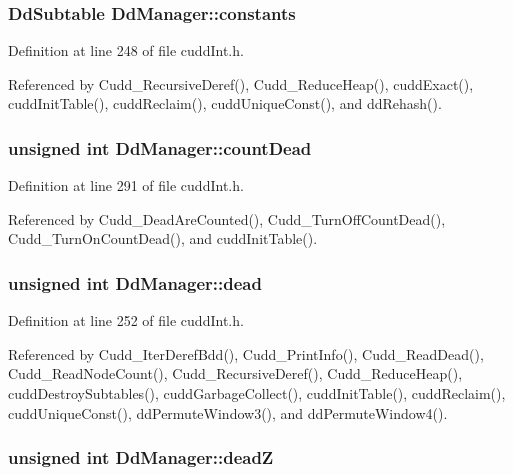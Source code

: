 \subsubsection{\setlength{\rightskip}{0pt plus 5cm}\bf{Dd\-Subtable} \bf{Dd\-Manager::constants}}\label{structDdManager_a8d293b6a4f69f6b4795e2fc24ede216}




Definition at line 248 of file cudd\-Int.h.

Referenced by Cudd\_\-Recursive\-Deref(), Cudd\_\-Reduce\-Heap(), cudd\-Exact(), cudd\-Init\-Table(), cudd\-Reclaim(), cudd\-Unique\-Const(), and dd\-Rehash().
\subsubsection{\setlength{\rightskip}{0pt plus 5cm}unsigned int \bf{Dd\-Manager::count\-Dead}}\label{structDdManager_dcbc5af2bbf3df86223e5f0b3bc03e76}




Definition at line 291 of file cudd\-Int.h.

Referenced by Cudd\_\-Dead\-Are\-Counted(), Cudd\_\-Turn\-Off\-Count\-Dead(), Cudd\_\-Turn\-On\-Count\-Dead(), and cudd\-Init\-Table().
\subsubsection{\setlength{\rightskip}{0pt plus 5cm}unsigned int \bf{Dd\-Manager::dead}}\label{structDdManager_170c1cfcbbd9b83bb479fc85c177c52e}




Definition at line 252 of file cudd\-Int.h.

Referenced by Cudd\_\-Iter\-Deref\-Bdd(), Cudd\_\-Print\-Info(), Cudd\_\-Read\-Dead(), Cudd\_\-Read\-Node\-Count(), Cudd\_\-Recursive\-Deref(), Cudd\_\-Reduce\-Heap(), cudd\-Destroy\-Subtables(), cudd\-Garbage\-Collect(), cudd\-Init\-Table(), cudd\-Reclaim(), cudd\-Unique\-Const(), dd\-Permute\-Window3(), and dd\-Permute\-Window4().
\subsubsection{\setlength{\rightskip}{0pt plus 5cm}unsigned int \bf{Dd\-Manager::dead\-Z}}\label{structDdManager_023bca6151c211d2d547da82a8f05d8b}




